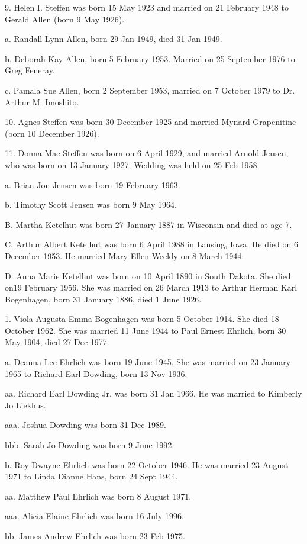 \documentclass[a4paper]{article}
\begin{document}
9. Helen I. Steffen was born 15 May 1923 and married on 21 February 1948 to Gerald Allen (born 9 May 1926).

a. Randall Lynn Allen, born 29 Jan 1949, died 31 Jan 1949.

b. Deborah Kay Allen, born 5 February 1953.  Married on 25 September 1976 to  Greg Feneray.

c.  Pamala Sue Allen, born 2 September 1953, married on 7 October 1979 to Dr. Arthur M. Imoshito.

10. Agnes Steffen was born 30 December 1925 and married Mynard Grapenitine (born 10 December 1926).

11. Donna Mae Steffen was born on 6 April 1929, and married Arnold Jensen, who was born on 13 January 1927.  Wedding was held on 25 Feb 1958. 

a. Brian Jon Jensen was born 19 February 1963.

b. Timothy Scott Jensen was born 9 May 1964.

B. Martha Ketelhut was born 27 January 1887 in Wisconsin and died at age 7.

C. Arthur Albert Ketelhut was born 6 April 1988 in Lansing, Iowa.  He died on 6 December 1953.  He married Mary Ellen Weekly on 8 March 1944.

D.  Anna Marie Ketelhut was born on 10 April 1890 in South Dakota.  She died on19 February 1956.  She was married on 26 March 1913 to Arthur Herman Karl Bogenhagen, born 31 January 1886, died 1 June 1926.

1. Viola Augusta Emma Bogenhagen was born 5 October 1914.  She died 18 October 1962.  She was married 11 June 1944 to Paul Ernest Ehrlich, born 30 May 1904, died 27 Dec 1977.

a. Deanna Lee Ehrlich was born 19 June 1945.  She was married on 23 January 1965 to Richard Earl Dowding, born 13 Nov 1936.

aa. Richard Earl Dowding Jr. was born 31 Jan 1966. He was married to Kimberly Jo Liekhus.

aaa. Joshua Dowding was born 31 Dec 1989.

bbb. Sarah Jo Dowding was born 9 June 1992. 

b. Roy Dwayne Ehrlich was born 22 October 1946.  He was married 23 August 1971 to Linda Dianne Hans, born 24 Sept 1944.

aa. Matthew Paul Ehrlich was born 8 August 1971.

aaa. Alicia Elaine Ehrlich was born 16 July 1996.

bb. James Andrew Ehrlich was born 23 Feb 1975.
\end{document}
